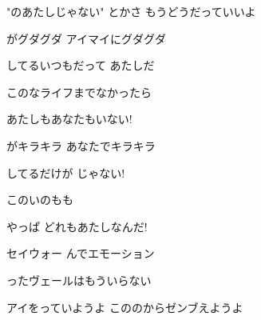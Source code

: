 \documentclass[a4paper,tate,twocolumn,12pt]{ltjtarticle}
\begin{document}
\begin{flushleft}
\vspace{2em}

\noindent\begin{minipage}{\linewidth}
"のあたしじゃない" とかさ もうどうだっていいよ
\end{minipage}

\vspace{2em}

\noindent\begin{minipage}{\linewidth}
がグダグダ アイマイにグダグダ

してるいつもだって あたしだ

このなライフまでなかったら

あたしもあなたもいない!
\end{minipage}

\vspace{2em}

\noindent\begin{minipage}{\linewidth}
がキラキラ あなたでキラキラ

してるだけが じゃない!

このいのもも

やっぱ どれもあたしなんだ!
\end{minipage}

\vspace{2em}

\noindent\begin{minipage}{\linewidth}
セイウォー んでエモーション

ったヴェールはもういらない

アイをっていようよ こののからゼンブえようよ
\end{minipage}

\end{flushleft}
\end{document}
